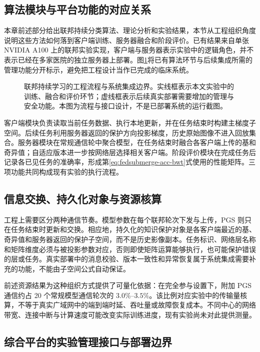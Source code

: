 \subsection{算法模块与平台功能的对应关系}

本章前述部分给出联邦持续分类算法、理论分析和实验结果，本节从工程组织角度说明这些方法如何落到客户端训练、服务器融合和阶段评价。已有结果来自单张 NVIDIA A100 上的联邦实验实现，客户端与服务器表示实验中的逻辑角色，并不表示已经在多家医院的独立服务器上部署。图\ref{fig:fedsubmerge-engineering}将已有算法环节与后续集成所需的管理功能分开标示，避免把工程设计当作已完成的临床系统。

\begin{figure}[htbp]
\centering

\caption[联邦持续学习的工程流程与系统集成边界]{联邦持续学习的工程流程与系统集成边界。实线框表示本文实验中的训练、融合和评价环节；虚线框表示后续真实部署需要增加的管理与安全功能。本图为流程与接口设计，不是已部署系统的运行截图。}
\label{fig:fedsubmerge-engineering}
\end{figure}

客户端模块负责读取当前任务数据、执行本地更新，并在任务结束时构建主梯度子空间。后续任务利用服务器返回的保护方向投影梯度，历史原始图像不进入回放集合。服务器模块在常规通信轮中聚合模型，在任务结束时融合各客户端上传的基和奇异值；自适应版本进一步按网络层选择相关客户端。阶段评价模块在完成任务后记录各已见任务的准确率，形成第\ref{eq:fedsubmerge-acc-bwt}式使用的性能矩阵。三项功能共同构成现有实验的执行流程。

\subsection{信息交换、持久化对象与资源核算}

工程上需要区分两种通信节奏。模型参数在每个联邦轮次下发与上传，PGS 则只在任务结束时更新和交换。相应地，持久化的知识保护对象是各客户端最近的基、奇异值和服务器返回的保护子空间，而不是历史影像副本。任务标识、网络层名称和矩阵维度必须与被投影参数对应，否则即使矩阵运算能够执行，也可能保护错误的层或任务。真实部署中的消息校验、版本一致性和异常恢复属于系统集成需要补充的功能，不能由子空间公式自动保证。

前述资源结果为这种组织方式提供了可量化依据：在完全参与设置下，附加 PGS 通信约占 20 个常规模型通信轮次的 $3.0\%$--$3.5\%$。该比例对应实验中的传输量核算，不等于真实广域网中的端到端时延、吞吐量或故障恢复成本。不同中心的网络带宽、连接中断与计算速度可能改变实际训练进度，现有实验尚未对此提供测量。

\subsection{综合平台的实验管理接口与部署边界}

